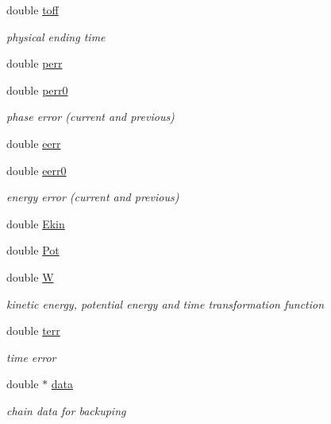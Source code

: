 \begin{DoxyCompactItemize}
double \hyperlink{classARC_1_1chaininfo_a4c24552fe5d2005171233432f3cf3832}{toff}
\begin{DoxyCompactList}\small\item\em physical ending time \end{DoxyCompactList}\item 
double \hyperlink{classARC_1_1chaininfo_a83dc2c6904ccf789ac299db95fa57bc5}{perr}
\item 
double \hyperlink{classARC_1_1chaininfo_aa5687aa0deb33f878f2283befe978d5f}{perr0}
\begin{DoxyCompactList}\small\item\em phase error (current and previous) \end{DoxyCompactList}\item 
double \hyperlink{classARC_1_1chaininfo_a2a4787b1089da59e9ad8f008d211faed}{eerr}
\item 
double \hyperlink{classARC_1_1chaininfo_aa25da11049199a727d6d94c172ed93ae}{eerr0}
\begin{DoxyCompactList}\small\item\em energy error (current and previous) \end{DoxyCompactList}\item 
double \hyperlink{classARC_1_1chaininfo_a7732d57314ddb49eb996eb41056a0140}{Ekin}
\item 
double \hyperlink{classARC_1_1chaininfo_afcefd59678495b4fb0e42b5b481cd875}{Pot}
\item 
double \hyperlink{classARC_1_1chaininfo_a1072512674fc88001d6cd560a6c7d295}{W}
\begin{DoxyCompactList}\small\item\em kinetic energy, potential energy and time transformation function \end{DoxyCompactList}\item 
double \hyperlink{classARC_1_1chaininfo_a665c9bc8dfdac9fdee4947e8aaffd8c6}{terr}
\begin{DoxyCompactList}\small\item\em time error \end{DoxyCompactList}\item 
double $\ast$ \hyperlink{classARC_1_1chaininfo_aee6f50a67bbc6f5ed555faa6fe2ecf51}{data}
\begin{DoxyCompactList}\small\item\em chain data for backuping \end{DoxyCompactList}\end{DoxyCompactItemize}


